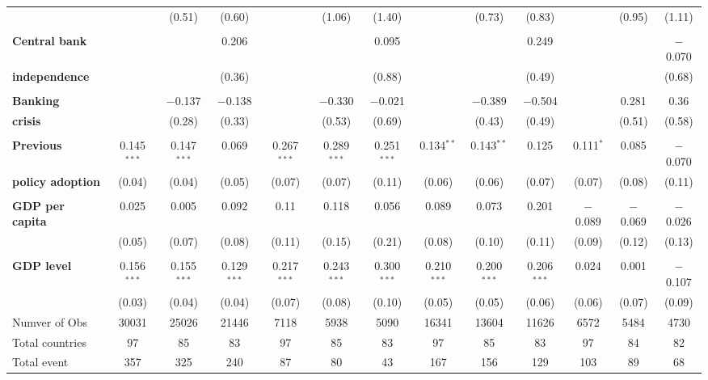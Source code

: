 \begin{table}[tb]
{\begin{tabular}{@{\extracolsep{5pt}}lcccccccccccc}
	&		&	 (0.51)	&	 (0.60)	&		&	 (1.06)	&	 (1.40)	&		&	 (0.73)	&	 (0.83)	&		&	 (0.95)	&	 (1.11)	\\
	&		&		&		&		&		&		&		&		&		&		&		&		\\
\textbf{Central bank}	&		&		&	0.206	&		&		&	0.095	&		&		&	0.249	&		&		&	 $-$0.070 	\\
\textbf{independence}	&		&		&	 (0.36)	&		&		&	 (0.88)	&		&		&	 (0.49)	&		&		&	 (0.68)	\\
	&		&		&		&		&		&		&		&		&		&		&		&		\\
\textbf{Banking}	&		&	 $-$0.137 	&	 $-$0.138 	&		&	 $-$0.330 	&	 $-$0.021 	&		&	 $-$0.389 	&	 $-$0.504 	&		&	0.281	&	0.36	\\
\textbf{crisis}	&		&	 (0.28)	&	 (0.33)	&		&	 (0.53)	&	 (0.69)	&		&	 (0.43)	&	 (0.49)	&		&	 (0.51)	&	 (0.58)	\\
	&		&		&		&		&		&		&		&		&		&		&		&		\\
\textbf{Previous}	&	 0.145$^{***}$ 	&	 0.147$^{***}$ 	&	0.069	&	 0.267$^{***}$ 	&	 0.289$^{***}$ 	&	 0.251$^{***}$ 	&	 0.134$^{**}$ 	&	 0.143$^{**}$ 	&	0.125	&	 0.111$^{*}$ 	&	0.085	&	 $-$0.070	\\
\textbf{policy adoption}	&	 (0.04)	&	 (0.04)	&	 (0.05)	&	 (0.07)	&	 (0.07)	&	 (0.11)	&	 (0.06)	&	 (0.06)	&	 (0.07)	&	 (0.07)	&	 (0.08)	&	 (0.11)	\\
	&		&		&		&		&		&		&		&		&		&		&		&		\\
\textbf{GDP per capita}	&	0.025	&	0.005	&	0.092	&	0.11	&	0.118	&	0.056	&	0.089	&	0.073	&	0.201	&	 $-$0.089 	&	 $-$0.069 	&	 $-$0.026	\\
	&	 (0.05)	&	 (0.07)	&	 (0.08)	&	 (0.11)	&	 (0.15)	&	 (0.21)	&	 (0.08)	&	 (0.10)	&	 (0.11)	&	 (0.09)	&	 (0.12)	&	 (0.13)	\\
	&		&		&		&		&		&		&		&		&		&		&		&		\\
\textbf{GDP level}	&	 0.156$^{***}$ 	&	 0.155$^{***}$ 	&	 0.129$^{***}$ 	&	 0.217$^{***}$ 	&	 0.243$^{***}$ 	&	 0.300$^{***}$ 	&	 0.210$^{***}$ 	&	 0.200$^{***}$ 	&	 0.206$^{***}$ 	&	0.024	&	0.001	&	 $-$0.107 	\\
	&	 (0.03)	&	 (0.04)	&	 (0.04)	&	 (0.07)	&	 (0.08)	&	 (0.10)	&	 (0.05)	&	 (0.05)	&	 (0.06)	&	 (0.06)	&	 (0.07)	&	 (0.09)	\\
\midrule																									
Numver of Obs	&	30031	&	25026	&	21446	&	7118	&	5938	&	5090	&	16341	&	13604	&	11626	&	6572	&	5484	&	4730	\\
Total countries	&	97	&	85	&	83	&	97	&	85	&	83	&	97	&	85	&	83	&	97	&	84	&	82	\\
Total event	&	357	&	325	&	240	&	87	&	80	&	43	&	167	&	156	&	129	&	103	&	89	&	68	\\

\end{tabular}}
\end{table}
